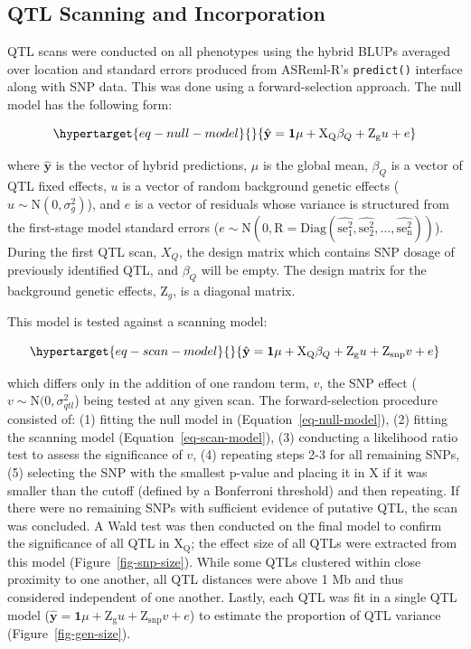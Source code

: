 \hypertarget{qtl-scanning-and-incorporation}{%
\subsection{QTL Scanning and
Incorporation}\label{qtl-scanning-and-incorporation}}

QTL scans were conducted on all phenotypes using the hybrid BLUPs
averaged over location and standard errors produced from ASReml-R's
\texttt{predict()} interface along with SNP data. This was done using a
forward-selection approach. The null model has the following form:

\begin{equation}\protect\hypertarget{eq-null-model}{}{ \hat{\mathbf{y}} = \mathbf{1}\mu + \mathrm{X_Q}\beta_{Q} + \mathrm{Z_g}u + e }\label{eq-null-model}\end{equation}

where \(\hat{\mathbf{y}}\) is the vector of hybrid predictions, \(\mu\)
is the global mean, \(\beta_Q\) is a vector of QTL fixed effects, \(u\)
is a vector of random background genetic effects
(\(u \sim \mathrm{N}(0, \sigma^2_g)\)), and \(e\) is a vector of
residuals whose variance is structured from the first-stage model
standard errors
(\(e\sim \mathrm{N}(0, \mathrm{R = Diag(\hat{se^2_1}, \hat{se^2_2}, \ldots, \hat{se^2_n})})\)).
During the first QTL scan, \(X_Q\), the design matrix which contains SNP
dosage of previously identified QTL, and \(\beta_Q\) will be empty. The
design matrix for the background genetic effects, \(\mathrm Z_g\), is a
diagonal matrix.

This model is tested against a scanning model:

\begin{equation}\protect\hypertarget{eq-scan-model}{}{ \hat{\mathbf{y}} = \mathbf{1}\mu + \mathrm{X_Q}\beta_{Q} + \mathrm{Z_g}u + \mathrm{Z_{snp}}v + e }\label{eq-scan-model}\end{equation}

which differs only in the addition of one random term, \(v\), the SNP
effect (\(v \sim \mathrm{N(0,}\sigma^2_{qtl}\)) being tested at any
given scan. The forward-selection procedure consisted of: (1) fitting
the null model in (Equation~\ref{eq-null-model}), (2) fitting the
scanning model (Equation~\ref{eq-scan-model}), (3) conducting a
likelihood ratio test to assess the significance of \(v\), (4) repeating
steps 2-3 for all remaining SNPs, (5) selecting the SNP with the
smallest p-value and placing it in \(\mathrm{X}\) if it was smaller than
the cutoff (defined by a Bonferroni threshold) and then repeating. If
there were no remaining SNPs with sufficient evidence of putative QTL,
the scan was concluded. A Wald test was then conducted on the final
model to confirm the significance of all QTL in \(\mathrm{X_Q}\); the
effect size of all QTLs were extracted from this model
(Figure~\ref{fig-snp-size}). While some QTLs clustered within close proximity to one another, all QTL distances were above 1 Mb and thus considered independent of one another. Lastly, each QTL was fit in a single QTL
model
(\(\hat{\mathbf{y}} = \mathbf{1}\mu + \mathrm{Z_g}u + \mathrm{Z_{snp}}v + e\))
to estimate the proportion of QTL variance (Figure~\ref{fig-gen-size}).

